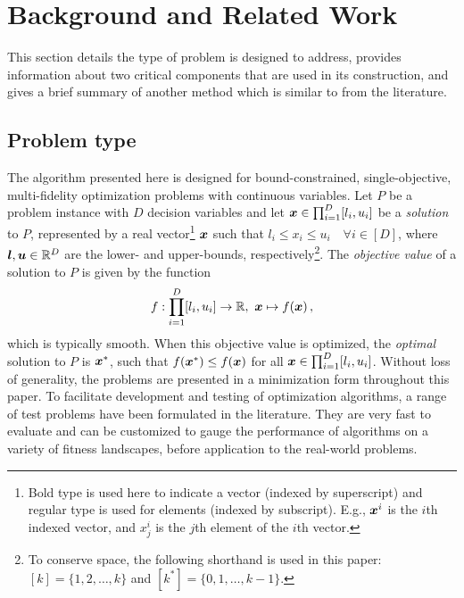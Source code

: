 \section{Background and Related Work}\label{sec:back}
This section details the type of problem \AlgName{} is designed to address, provides information about two critical components that are used in its construction, and gives a brief summary of another method which is similar to \AlgName{} from the literature.

\subsection{Problem type}
The algorithm presented here is designed for bound-constrained, single-objective, multi-fidelity optimization problems with continuous variables. Let $P$ be a problem instance with $D$ decision variables and let $\boldsymbol{x} \in \prod^D_{i=1}[l_i,u_i]$ be a \emph{solution} to $P$, represented by a real vector\footnote{Bold type is used here to indicate a vector (indexed by superscript) and regular type is used for elements (indexed by subscript). E.g., $\boldsymbol{x}^i$ is the $i$th indexed vector, and $x_j^i$ is the $j$th element of the $i$th vector.} $\boldsymbol{x}$ such that $l_i \le x_i \le u_i \quad \forall {i \in [D]}$, where $\boldsymbol{l},\boldsymbol{u} \in \mathbb{R}^D$ are the lower- and upper-bounds, respectively\footnote{To conserve space, the following shorthand is used in this paper: ${[k] = \{1,2,\dots,k\}}$ and $[k^*] = \{0,1,\dots,k-1\}$.}. The \emph{objective value} of a solution to $P$ is given by the function
\begin{equation}
f:\displaystyle\prod^D_{i=1}[l_i,u_i]\to \mathbb{R},\ \boldsymbol{x} \mapsto f(\boldsymbol{x})\,, \label{eq:objective}
\end{equation}
which is typically smooth. When this objective value is optimized, the \emph{optimal} solution to $P$ is $\boldsymbol{x}^*$, such that $f(\boldsymbol{x}^*) \leq f(\boldsymbol{x})$ for all $\boldsymbol{x} \in \prod^D_{i=1}[l_i,u_i]$. Without loss of generality, the problems are presented in a minimization form throughout this paper. 
To facilitate development and testing of optimization algorithms, a range of test problems have been formulated in the literature. They are very fast to evaluate and can be customized to gauge the performance of algorithms on a variety of fitness landscapes, before application to the real-world problems.

